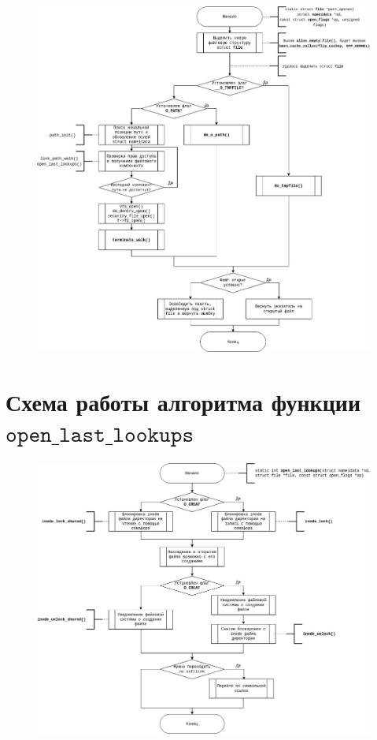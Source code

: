 \documentclass[a4paper,14pt]{extreport}
\begin{document}
\begin{figure}[H]
	\centering
	\includegraphics[scale=0.54]{img/path_openat.jpg}
	\label{fig:path_openat}
\end{figure}

\section{Схема работы алгоритма функции $\texttt{open\_last\_lookups}$}

\begin{figure}[H]
	\centering
	\includegraphics[scale=0.52]{img/open_last_lookups.jpg}
	\label{fig:do_last}
\end{figure}
\end{document}
